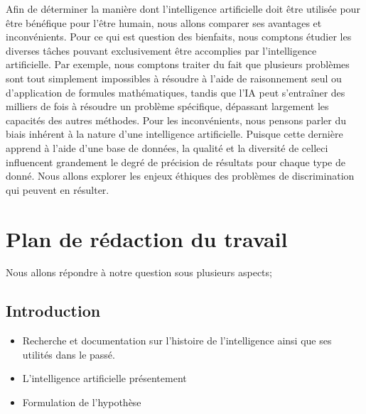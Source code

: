 \documentclass[letterpaper,10pt,french]{sphinxmanual}
\begin{document}
Afin de déterminer la manière dont l’intelligence artificielle doit être utilisée pour être bénéfique pour l’être humain, nous allons comparer ses avantages et inconvénients. Pour ce qui est question des bienfaits, nous comptons étudier les diverses tâches pouvant exclusivement être accomplies par l’intelligence artificielle. Par exemple, nous comptons traiter du fait que plusieurs problèmes sont tout simplement impossibles à résoudre à l’aide de raisonnement seul ou d’application de formules mathématiques, tandis que l’IA peut s’entraîner des milliers de fois à résoudre un problème spécifique, dépassant largement les capacités des autres méthodes. Pour les inconvénients, nous pensons parler du biais inhérent à la nature d’une intelligence artificielle. Puisque cette dernière apprend à l’aide d’une base de données, la qualité et la diversité de celle\sphinxhyphen{}ci influencent grandement le degré de précision de résultats pour chaque type de donné. Nous allons explorer les enjeux éthiques des problèmes de discrimination qui peuvent en résulter.


\section{Plan de rédaction du travail}
\label{\detokenize{plan:plan-de-redaction-du-travail}}\label{\detokenize{plan::doc}}
Nous allons répondre à notre question sous plusieurs aspects;


\subsection{Introduction}
\label{\detokenize{plan:introduction}}\begin{itemize}
\item {} 
Recherche et documentation sur l’histoire de l’intelligence ainsi que ses
utilités dans le passé.

\item {} 
L’intelligence artificielle présentement

\item {} 
Formulation de l’hypothèse

\end{itemize}
\end{document}
